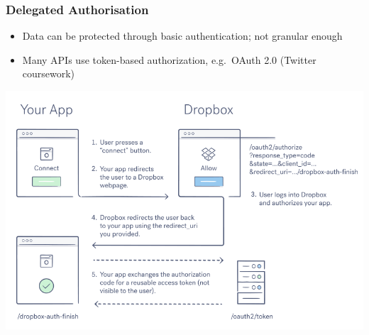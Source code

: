 \documentclass[aspectratio=169]{beamer}
\begin{document}
\begin{frame}
	\frametitle{Delegated Authorisation}
	\begin{itemize}
		\item Data can be protected through basic authentication; not granular enough
		\item Many APIs use token-based authorization, e.g.\ OAuth 2.0 (Twitter coursework)
	\end{itemize}
	\centering
	\includegraphics[width=\textheight]{oauth2-web-diagram}
\end{frame}
\end{document}

